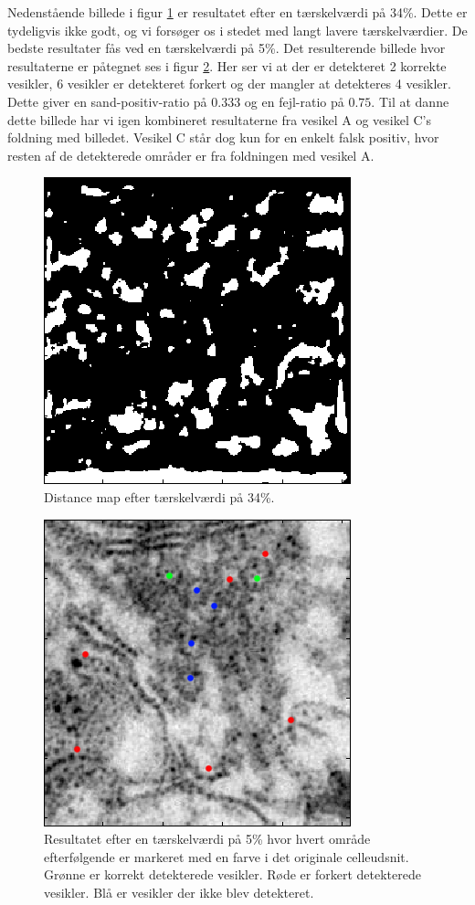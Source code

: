 Nedenstående billede i figur \ref{fig:postmethod_conv_post_img2_th34} er resultatet efter en tærskelværdi på 34\%. Dette er tydeligvis ikke godt, og vi forsøger os i stedet med langt lavere tærskelværdier. De bedste resultater fås ved en tærskelværdi på 5\%. Det resulterende billede hvor resultaterne er påtegnet ses i figur \ref{fig:postmethod_conv_post_img2_th5}. Her ser vi at der er detekteret 2 korrekte vesikler, 6 vesikler er detekteret forkert og der mangler at detekteres 4 vesikler. Dette giver en sand-positiv-ratio på $0.333$ og en fejl-ratio på $0.75$. Til at danne dette billede har vi igen kombineret resultaterne fra vesikel A og vesikel C's foldning med billedet. Vesikel C står dog kun for en enkelt falsk positiv, hvor resten af de detekterede områder er fra foldningen med vesikel A.

\begin{figure}[H]
		\centering		\includegraphics[scale=0.65]{files/postmethod/img/ves1+2_img2_th-34.png}
	\caption{Distance map efter tærskelværdi på 34\%.\label{fig:postmethod_conv_post_img2_th34}}
\end{figure}

\begin{figure}[H]
		\centering
	\includegraphics[scale=0.65]{files/postmethod/img/ves1+2_img2_th-5.png}
	\caption{Resultatet efter en tærskelværdi på 5\% hvor hvert område efterfølgende er markeret med en farve i det originale celleudsnit. Grønne er korrekt detekterede vesikler. Røde er forkert detekterede vesikler. Blå er vesikler der ikke blev detekteret.\label{fig:postmethod_conv_post_img2_th5}}
\end{figure}

